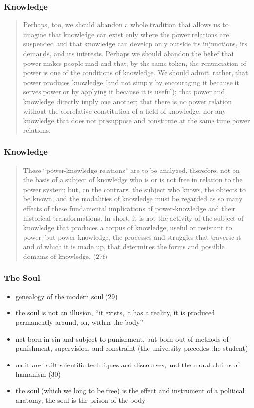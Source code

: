 \documentclass[xcolor=dvipsnames]{beamer}
\begin{document}
\begin{frame}
  \frametitle{Knowledge}
  \begin{quote}
    Perhaps, too, we should abandon a whole tradition that allows us
    to imagine that knowledge can exist only where the power relations
    are suspended and that knowledge can develop only outside its
    injunctions, its demands, and its interests. Perhaps we should
    abandon the belief that power makes people mad and that, by the
    same token, the renunciation of power is one of the conditions of
    knowledge. We should admit, rather, that power produces knowledge
    (and not simply by encouraging it because it serves power or by
    applying it because it is useful); that power and knowledge
    directly imply one another; that there is no power relation
    without the correlative constitution of a field of knowledge, nor
    any knowledge that does not presuppose and constitute at the same
    time power relations. 
  \end{quote}
\end{frame}

\begin{frame}
  \frametitle{Knowledge}
  \begin{quote}
    These ``power-knowledge relations'' are to be analyzed, therefore,
    not on the basis of a subject of knowledge who is or is not free
    in relation to the power system; but, on the contrary, the subject
    who knows, the objects to be known, and the modalities of
    knowledge must be regarded as so many effects of these fundamental
    implications of power-knowledge and their historical
    transformations. In short, it is not the activity of the subject
    of knowledge that produces a corpus of knowledge, useful or
    resistant to power, but power-knowledge, the processes and
    struggles that traverse it and of which it is made up, that
    determines the forms and possible domains of knowledge. (27f)
  \end{quote}
\end{frame}

\begin{frame}
  \frametitle{The Soul}
  \begin{itemize}
  \item genealogy of the modern soul (29)
  \item the soul is not an illusion, ``it exists, it has a reality, it
    is produced permanently around, on, within the body''
  \item not born in sin and subject to punishment, but born out of
    methods of punishment, supervision, and constraint (the university
    precedes the student)
  \item on it are built scientific techniques and discourses, and the
    moral claims of humanism (30)
  \item the soul (which we long to be free) is the effect and
    instrument of a political anatomy; the soul is the prison of the
    body
  \end{itemize}
\end{frame}
\end{document}
